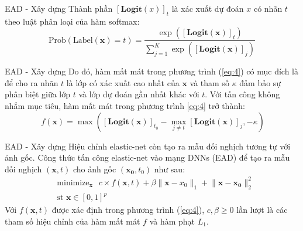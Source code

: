 \begin{frame}{EAD - Xây dựng}
    Thành phần $[\textbf{Logit}(x)]_t$ là xác xuất dự đoán $x$ có nhãn $t$ theo 
    luật phân loại của hàm softmax:
    \begin{equation}
        \label{eq:5}
        \text{Prob}(\text{Label}(\mathbf{x}) = t) = \frac{\exp([\textbf{Logit}(\mathbf{x})]_t)}{
            \sum_{j=1}^{K} \exp([\textbf{Logit}(\mathbf{x})]_j)
        }
    \end{equation}
\end{frame}

\begin{frame}{EAD - Xây dựng}
    Do đó, hàm mất mát trong phương trình (\ref{eq:4}) có mục đích là để cho ra nhãn $t$ là 
    lớp có xác xuất cao nhất của $\mathbf{x}$ và tham số $\kappa$ đảm bảo sự phân biệt giữa lớp $t$
    và lớp dự đoán gần nhất khác với $t$. Với tấn công không nhắm mục tiêu, hàm mất mát trong 
    phương trình \ref{eq:4} trở thành:
    \begin{equation}
        \label{eq:6}\
        f(\mathbf{x}) = \max { \left([\textbf{Logit}(\mathbf{x})]_{t_0} - 
        \max_{j \neq t} [\textbf{Logit}(\mathbf{x})]_j, -\kappa \right) }
    \end{equation}
\end{frame}

\begin{frame}{EAD - Xây dựng}
    Hiệu chỉnh 
    elastic-net còn tạo ra mẫu đối nghịch tương tự với ảnh gốc. Công thức tấn công elastic-net
    vào mạng DNNs (EAD) để tạo ra mẫu đối nghịch $(\mathbf{x},t)$ cho ảnh gốc $(\mathbf{x_0}, t_0)$ như sau:
    \begin{equation}
        \label{eq:7}
        \begin{split}
        &\text{minimize}_{\mathbf{x}} \text{ }
        c \times f(\mathbf{x}, t) + \beta \lVert \mathbf{x} - x_0 \rVert_1
        + \lVert \mathbf{x} - \mathbf{x_0} \rVert_2^2 \\
        &\text{st   } \mathbf{x} \in [0,1]^p
        \end{split}
    \end{equation}
    Với $f(\mathbf{x},t)$ được xác định trong phương trình (\ref{eq:4}), $c, \beta \geq 0$ lần lượt 
    là các tham số  hiệu chỉnh của hàm mất mát $f$ và hàm phạt $L_1$.
\end{frame}